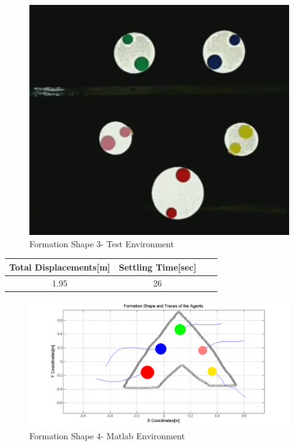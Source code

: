 \documentclass[twoside]{article}
\begin{document}
					\begin{figure}[H]
						\caption{Formation Shape 3- Test Environment}
						\centerline{\includegraphics[scale = 0.35]{5_real_hardware}}
					\end{figure} 
					
					\begin{center}
						 \label{tab:title} 
						\begin{tabular}{||c| c |c |c ||}
							
							\hline
							\textbf{Total Displacements[m]}  & \textbf{Settling Time[sec]}\\ 
							\hline
							1.95 & 26 \\
							\hline
						\end{tabular}
					\end{center}
		
		
					\begin{figure}[H]
						\caption{Formation Shape 4- Matlab Environment}
						\centerline{\includegraphics[scale = 0.45]{6_hardware}}
					\end{figure} 
					
\end{document}

